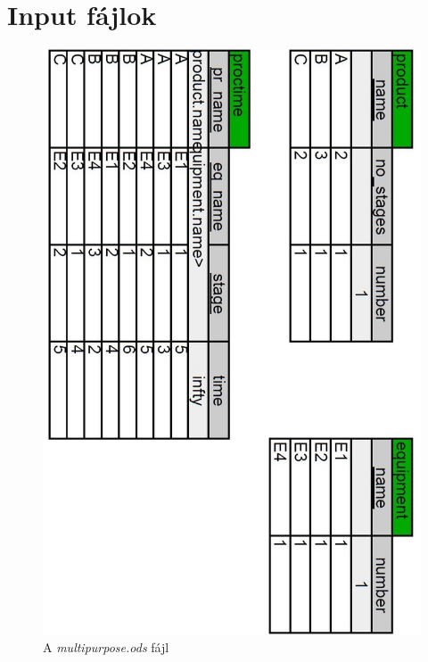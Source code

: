 \chapter{Input fájlok} \label{input_files}
\begin{figure}[H]
\begin{center}
\includegraphics[scale=0.4]{multipurposeOds}
\caption{A \textit{multipurpose.ods} fájl}
\label{multipurpose_ods}
\end{center}
\end{figure}
